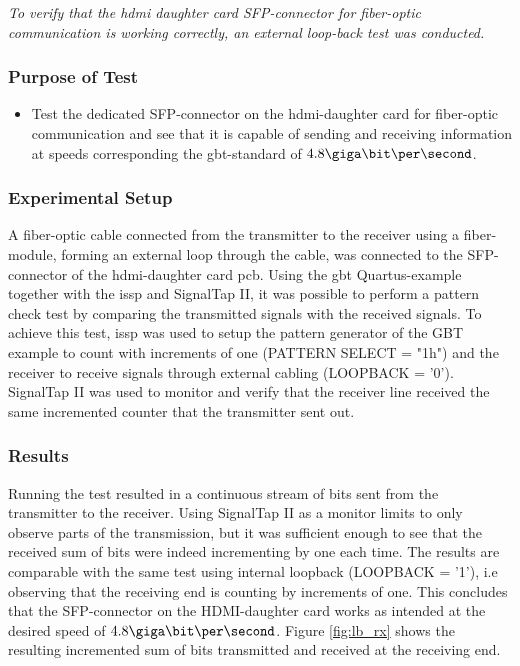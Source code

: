 \documentclass[main.tex]{subfiles}
\begin{document}
\textit{To verify that the \gls{hdmi} daughter card SFP-connector for fiber-optic communication is working correctly, an external loop-back test was conducted.}

\subsubsection{Purpose of Test}
\begin{itemize}\setlength{\itemsep}{10pt}

\item Test the dedicated SFP-connector on the \gls{hdmi}-daughter card for fiber-optic communication and see that it is capable of sending and receiving information at speeds corresponding the \gls{gbt}-standard of $4.8 \giga\bit\per\second$. 
\end{itemize}

\subsubsection{Experimental Setup}
A fiber-optic cable connected from the transmitter to the receiver using a fiber-module, forming an external loop through the cable, was connected to the SFP-connector of the \gls{hdmi}-daughter card \gls{pcb}. Using the \gls{gbt} Quartus-example together with the \gls{issp} and SignalTap II, it was possible to perform a pattern check test by comparing the transmitted signals with the received signals. To achieve this test, \gls{issp} was used to setup the pattern generator of the GBT example to count with increments of one (PATTERN SELECT = "1h") and the receiver to receive signals through external cabling (LOOPBACK = '0'). SignalTap II was used to monitor and verify that the receiver line received the same incremented counter that the transmitter sent out.

\subsubsection{Results}
Running the test resulted in a continuous stream of bits sent from the transmitter to the receiver. Using SignalTap II as a monitor limits to only observe parts of the transmission, but it was sufficient enough to see that the received sum of bits were indeed incrementing by one each time. The results are comparable with the same test using internal loopback (LOOPBACK = '1'), i.e observing that the receiving end is counting by increments of one. This concludes that the SFP-connector on the HDMI-daughter card works as intended at the desired speed of $4.8 \giga\bit\per\second$. Figure \ref{fig:lb_rx} shows the resulting incremented sum of bits transmitted and received at the receiving end.
\end{document}
